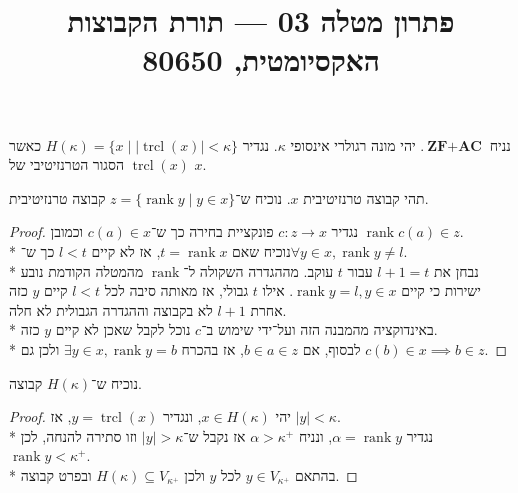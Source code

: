 
\title{פתרון מטלה 03 --- תורת הקבוצות האקסיומטית, 80650}

\DeclareMathOperator{\trcl}{trcl}
\DeclareMathOperator{\rank}{rank}


\maketitle
\maketitleprint{}

\Question{}
נניח $\textbf{ZF} + \textbf{AC}$.
יהי מונה רגולרי אינסופי $\kappa$. נגדיר $H(\kappa) = \{ x \mid |\trcl(x)| < \kappa \}$  כאשר $\trcl(x)$ הסגור הטרנזיטיבי של $x$.

תהי קבוצה טרנזיטיבית $x$.
נוכיח ש־$z = \{\rank y \mid y \in x \}$ קבוצה טרנזיטיבית.
\begin{proof}
	נגדיר $c : z \to x$ פונקציית בחירה כך ש־$c(a) \in x$ וכמובן $\rank c(a) \in z$. \\*
	נוכיח שאם $t = \rank x$, אז לא קיים $l < t$ כך ש־$\forall y \in x, \rank y \ne l$. \\*
	נבחן את $l + 1 = t$ עבור $t$ עוקב. מההגדרה השקולה ל־$\rank$ מהמטלה הקודמת נובע ישירות כי  קיים $\rank y = l, y \in x$. אילו $t$ גבולי, אז מאותה סיבה לכל $l < t$ קיים $y$ כזה אחרת $l + 1$ לא בקבוצה וההגדרה הגבולית לא חלה. \\*
	באינדוקציה מהמבנה הזה ועל־ידי שימוש ב־$c$ נוכל לקבל שאכן לא קיים $y$ כזה. \\*
	לבסוף, אם $b \in a \in z$, אז בהכרח $\exists y \in x, \rank y = b$ ולכן גם $c(b) \in x \implies b \in z$.
\end{proof}

\Question{}
נוכיח ש־$H(\kappa)$ קבוצה.
\begin{proof}
	יהי $x \in H(\kappa)$, ונגדיר $y = \trcl(x)$, אז $|y| < \kappa$. \\*
	נגדיר $\alpha = \rank y$, ונניח $\alpha > \kappa^+$ אז נקבל ש־$|y| > \kappa$ וזו סתירה להנחה, לכן $\rank y < \kappa^+$. \\*
	בהתאם $y \in V_{\kappa^+}$ לכל $y$ ולכן $H(\kappa) \subseteq V_{\kappa^+}$ ובפרט קבוצה.
\end{proof}

